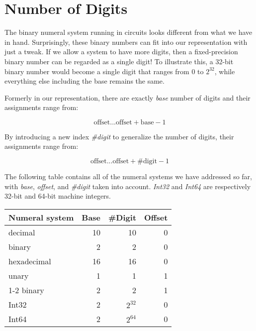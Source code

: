\documentclass[../thesis.tex]{subfiles}
\begin{document}
\section{Number of Digits}

The binary numeral system running in circuits looks different from what we have
in hand.
Surprisingly, these binary numbers can fit into our representation with just a tweak.
If we allow a system to have more digits,
then a fixed-precision binary number can be regarded as a single digit!
To illustrate this,
a 32-bit binary number would become a single digit that ranges from $ 0 $ to $ 2^{32} $,
while everything else including the base remains the same.

Formerly in our representation,
there are exactly \textit{base} number of digits and their assignments range from:

$$
    \text{offset}  ...  \text{offset} + \text{base} - 1
$$

By introducing a new index \textit{\#digit} to generalize the number of digits,
their assignments range from:

$$
    \text{offset}  ...  \text{offset} + \text{\#digit} - 1
$$

The following table contains all of the numeral systems we have addressed so far,
with \textit{base}, \textit{offset}, and \textit{\#digit} taken into account.
\textit{Int32} and \textit{Int64} are respectively 32-bit and 64-bit machine
integers.

\begin{center}
    \begin{adjustbox}{max width=\textwidth}
    \begin{tabular}{ | l | r | r | r | }
    \textbf{Numeral system} & \textbf{Base} & \textbf{\#Digit} & \textbf{Offset} \\
    \hline
    decimal         & 10 & 10 & 0 \\
    binary          & 2  & 2  & 0 \\
    hexadecimal     & 16 & 16 & 0 \\
    unary           & 1  & 1  & 1 \\
    1-2 binary      & 2  & 2  & 1 \\
    Int32           & 2  & $ 2^{32} $ & 0 \\
    Int64           & 2  & $ 2^{64} $ & 0 \\
    \end{tabular}
    \end{adjustbox}
\end{center}
\end{document}
